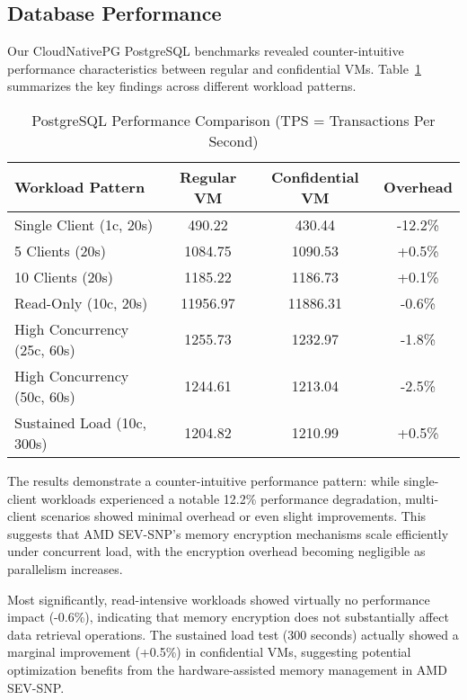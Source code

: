 \subsection{Database Performance}

Our CloudNativePG PostgreSQL benchmarks revealed counter-intuitive performance characteristics between regular and confidential VMs. Table~\ref{tab:postgresql_performance} summarizes the key findings across different workload patterns.

\begin{table}[htbp]
\centering
\caption{PostgreSQL Performance Comparison (TPS = Transactions Per Second)}
\label{tab:postgresql_performance}
\begin{tabular}{lccc}
\toprule
\textbf{Workload Pattern} & \textbf{Regular VM} & \textbf{Confidential VM} & \textbf{Overhead} \\
\midrule
Single Client (1c, 20s) & 490.22 & 430.44 & -12.2\% \\
5 Clients (20s) & 1084.75 & 1090.53 & +0.5\% \\
10 Clients (20s) & 1185.22 & 1186.73 & +0.1\% \\
Read-Only (10c, 20s) & 11956.97 & 11886.31 & -0.6\% \\
High Concurrency (25c, 60s) & 1255.73 & 1232.97 & -1.8\% \\
High Concurrency (50c, 60s) & 1244.61 & 1213.04 & -2.5\% \\
Sustained Load (10c, 300s) & 1204.82 & 1210.99 & +0.5\% \\
\bottomrule
\end{tabular}
\end{table}

The results demonstrate a counter-intuitive performance pattern: while single-client workloads experienced a notable 12.2\% performance degradation, multi-client scenarios showed minimal overhead or even slight improvements. This suggests that AMD SEV-SNP's memory encryption mechanisms scale efficiently under concurrent load, with the encryption overhead becoming negligible as parallelism increases.

Most significantly, read-intensive workloads showed virtually no performance impact (-0.6\%), indicating that memory encryption does not substantially affect data retrieval operations. The sustained load test (300 seconds) actually showed a marginal improvement (+0.5\%) in confidential VMs, suggesting potential optimization benefits from the hardware-assisted memory management in AMD SEV-SNP.

